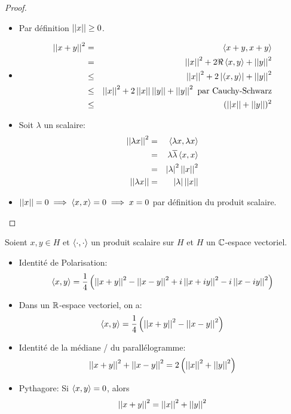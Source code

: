 \begin{proof}
	\begin{itemize}
		\item Par définition $\norm{x} \geq 0$.
		\item \begin{eqnarray*}
			      \norm{x + y}^2 &=& \sprod{x+y}{x+y} \\
			      &=&\norm x^2 + 2\Re \sprod{x}{y} + \norm{y}^2 \\
			      &\leq& \norm{x}^2 + 2\abs{\sprod{x}{y}} + \norm{y}^2 \\
			      &\leq& \norm{x}^2 + 2\norm{x}\norm{y} + \norm{y}^2 \text{ par Cauchy-Schwarz} \\
			      &\leq& (\norm{x} + \norm{y})^2
		      \end{eqnarray*}
		\item Soit $\lambda$ un scalaire:
		      \begin{eqnarray*}
			      \norm{\lambda x}^2 &=& \sprod{\lambda x}{\lambda x} \\
			      &=&\lambda \overline \lambda \sprod{x}{x} \\
			      &=& \abs{\lambda}^2 \norm{x}^2 \\
			      \norm{\lambda x} &=& \abs{\lambda} \norm{x}
		      \end{eqnarray*}
		\item $\norm{x} = 0 \implies \sprod{x}{x} = 0 \implies x = 0$ par définition du produit scalaire.
	\end{itemize}
\end{proof}

\begin{prop}
	Soient $x,y \in H$ et $\sprod{\cdot}{\cdot}$ un produit scalaire sur $H$ et $H$ un $\C$-espace vectoriel.

	\begin{itemize}
		\item Identité de Polarisation:
		      $$\sprod{x}{y} = \frac{1}{4} \left( \norm{x+y}^2 - \norm{x-y}^2 + i\norm{x+iy}^2 - i\norm{x-iy}^2 \right)$$
		\item Dans un $\R$-espace vectoriel, on a:
		      $$\sprod{x}{y} = \frac{1}{4} \left( \norm{x+y}^2 - \norm{x-y}^2 \right)$$
		\item Identité de la médiane / du parallélogramme:
		      $$\norm{x+y}^2 + \norm{x-y}^2 = 2\left( \norm{x}^2 + \norm{y}^2 \right)$$
		\item Pythagore: Si $\sprod{x}{y} = 0$, alors
		      $$ \norm{x+y}^2 = \norm{x}^2 + \norm{y}^2$$
	\end{itemize}
\end{prop}

